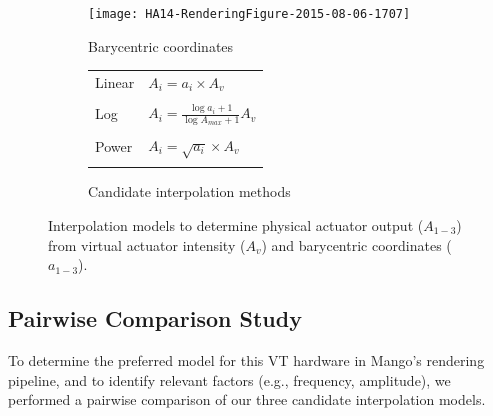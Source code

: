 

\begin{figure}[t] %
   \centering
  \begin{subfigure}[b]{0.4\textwidth}
	   \texttt{[image: HA14-RenderingFigure-2015-08-06-1707]} 
	   \caption{Barycentric coordinates}
	   \label{fig:rendering:algorithm:barycentric}
    \end{subfigure}
    \qquad
     \begin{subfigure}[b]{0.45\textwidth}
     		\begin{tabular}{l l}
	   	Linear & $A_i = a_i \times A_v$  \\ 
		\\
	   	Log & $A_i = \frac{\log{a_i+1}}{\log{A_{max} +1}}A_v$  \\
		\\
	   	Power & $A_i = \sqrt{a_i} \times A_v$
		\\
		\\
		\end{tabular}
	   \caption{Candidate interpolation methods}
	   \label{fig:rendering:algorithm:interpolation}
    \end{subfigure}
    	   \caption{Interpolation models to determine physical actuator output ($A_{1-3}$) from virtual actuator intensity ($A_v$) and barycentric coordinates ($a_{1-3}$).}
	   \label{fig:rendering:algorithm}
\end{figure}



%
%
%
\subsection{Pairwise Comparison Study}

To determine the preferred model for this VT hardware in Mango's rendering pipeline, and to identify relevant factors (e.g., frequency, amplitude), %
we performed a pairwise comparison of our three candidate interpolation models.

